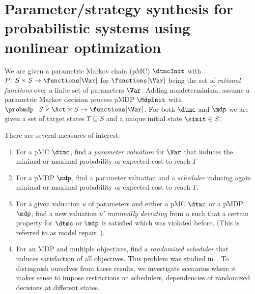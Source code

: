 \section{Parameter/strategy synthesis for probabilistic systems using nonlinear optimization}
We are given a parametric Markov chain (pMC) $\dtmcInit$ with $P\colon S\times S\rightarrow\functions[\Var]$ for $\functions[\Var]$ being the set of \emph{rational functions} over a finite set of parameters $\Var$. 
Adding nondeterminism, assume a parametric Markov decision process pMDP $\MdpInit$ with $\probmdp \colon S \times \Act \times S \rightarrow \functions[\Var]$. For both $\dtmc$ and $\mdp$ we are given a set of target states $T\subseteq S$ and a unique initial state $\sinit\in S$.

There are several measures of interest: 
\begin{enumerate}
	\item For a pMC $\dtmc$, find a \emph{parameter valuation} for $\Var$ that induces the minimal or maximal probability or expected cost to reach $T$ 
	\item For a pMDP $\mdp$, find a parameter valuation and a \emph{scheduler} inducing again minimal or maximal probability or expected cost to reach $T$.
	\item For a given valuation $u$ of parameters and either a pMC $\dtmc$ or a pMDP $\mdp$, find a new valuation $u'$ \emph{minimally deviating} from $u$ such that a certain property for $\dtmc$ or $\mdp$ is satisfied which was violated before. (This is referred to as model repair~\cite{bartocci2011model}).
	\item For an MDP and multiple objectives, find a \emph{randomized scheduler} that induces satisfaction of all objectives. This problem was studied in~\cite{DBLP:journals/lmcs/EtessamiKVY08,DBLP:conf/atva/ForejtKP12}. To distinguish ourselves from these results, we investigate scenarios where it makes sense to impose restrictions on schedulers, \ie dependencies of randomized decisions at different states.
\end{enumerate}


%

